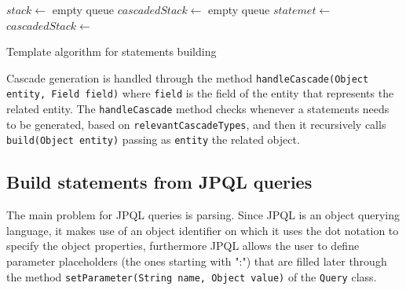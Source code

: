 \begin{algorithm}[h]
  \scriptsize
  \begin{algorithmic}[1]
    \State $stack \gets$ empty queue
    \State $cascadedStack \gets$ empty queue
	\State $statemet \gets$ 
    \State {}
          \State $cascadedStack \gets$ 
        \EndIf
          \State {}
        \Else
        	  \State {}
        	\EndIf
      \Else
          \State {}
        	\EndIf
      \EndIf
          \State {}
        \Else
          \State {}
        \EndIf
    \EndFor        
    \State {}
      \State {}
    \EndIf
  \EndFunction
  \end{algorithmic}
  \caption{Template algorithm for statements building}
  \label{code:statements-building}
\end{algorithm}

\noindent Cascade generation is handled through the method \texttt{handleCascade(Object entity, Field field)} where \texttt{field} is the field of the entity that represents the related entity. The \texttt{handleCascade} method checks whenever a statements needs to be generated, based on \texttt{relevantCascadeTypes}, and then it recursively calls \texttt{build(Object entity)} passing as \texttt{entity} the related object. 

\subsection{Build statements from JPQL queries}
The main problem for JPQL queries is parsing. Since JPQL is an object querying language, it makes use of an object identifier on which it uses the dot notation to specify the object properties, furthermore JPQL allows the user to define parameter placeholders (the ones starting with ":") that are filled later through the method \texttt{setParameter(String name, Object value)} of the \texttt{Query} class.

